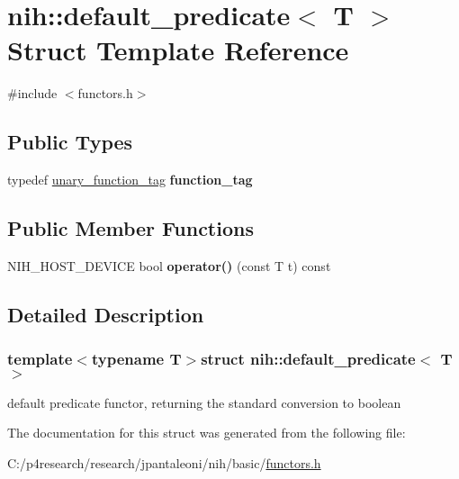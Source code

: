 \hypertarget{structnih_1_1default__predicate}{
\section{nih\-:\-:default\-\_\-predicate$<$ \-T $>$ \-Struct \-Template \-Reference}
\label{structnih_1_1default__predicate}
}


{\ttfamily \#include $<$functors.\-h$>$}

\subsection*{\-Public \-Types}
\begin{DoxyCompactItemize}
\item 
\hypertarget{structnih_1_1default__predicate_a3c78b6a78c286e17e67eff3392e965d2}{
typedef \hyperlink{structnih_1_1unary__function__tag}{unary\-\_\-function\-\_\-tag} {\bfseries function\-\_\-tag}}
\label{structnih_1_1default__predicate_a3c78b6a78c286e17e67eff3392e965d2}

\end{DoxyCompactItemize}
\subsection*{\-Public \-Member \-Functions}
\begin{DoxyCompactItemize}
\item 
\hypertarget{structnih_1_1default__predicate_aeac797a71589ecdaaf2e528f9f7c88a4}{
\-N\-I\-H\-\_\-\-H\-O\-S\-T\-\_\-\-D\-E\-V\-I\-C\-E bool {\bfseries operator()} (const \-T t) const }
\label{structnih_1_1default__predicate_aeac797a71589ecdaaf2e528f9f7c88a4}

\end{DoxyCompactItemize}


\subsection{\-Detailed \-Description}
\subsubsection*{template$<$typename T$>$struct nih\-::default\-\_\-predicate$<$ T $>$}

default predicate functor, returning the standard conversion to boolean 

\-The documentation for this struct was generated from the following file\-:\begin{DoxyCompactItemize}
\item 
\-C\-:/p4research/research/jpantaleoni/nih/basic/\hyperlink{functors_8h}{functors.\-h}\end{DoxyCompactItemize}
